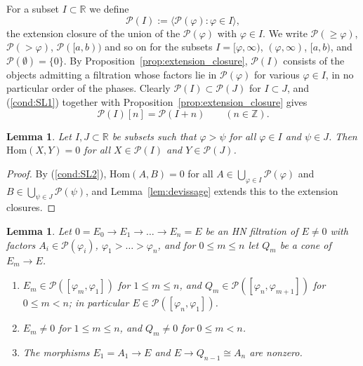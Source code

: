 \documentclass[12pt]{amsart}
\newcommand{\condref}[1]{\textup{(\ref{#1})}}
\newtheorem{lemma}[theorem]{Lemma}
\numberwithin{theorem}{section}
\theoremstyle{definition}
\newcommand{\RR}{\mathbb{R}}
\newcommand{\ZZ}{\mathbb{Z}}
\newcommand{\calP}{\mathcal{P}}
\newcommand{\Hom}{\mathrm{Hom}}
\begin{document}
	For a subset $I \subset \RR$ we define
	\[
	\calP(I) := \big\langle \calP(\varphi) : \varphi \in I \big\rangle ,
	\]
	the extension closure of the union of the $\calP(\varphi)$ with $\varphi \in I$.
	We write $\calP(\geqslant \varphi)$, $\calP(> \varphi)$, $\calP([a, b))$ and so on for the subsets $I = [\varphi, \infty)$, $(\varphi, \infty)$, $[a, b)$, and $\calP(\emptyset) = \{ 0 \}$.
	By Proposition~\ref{prop:extension_closure}, $\calP(I)$ consists of the objects admitting a filtration whose factors lie in $\calP(\varphi)$ for various $\varphi \in I$, in no particular order of the phases.
	Clearly $\calP(I) \subset \calP(J)$ for $I \subset J$, and \condref{cond:SL1} together with Proposition~\ref{prop:extension_closure} gives
	\[
	\calP(I)[n] = \calP(I + n) \qquad (n \in \ZZ) .
	\]

	\begin{lemma}
		\label{lem:slicing_orthogonal}
		Let $I, J \subset \RR$ be subsets such that $\varphi > \psi$ for all $\varphi \in I$ and $\psi \in J$.
		Then $\Hom(X, Y) = 0$ for all $X \in \calP(I)$ and $Y \in \calP(J)$.
	\end{lemma}

	\begin{proof}
		By \condref{cond:SL2}, $\Hom(A, B) = 0$ for all $A \in \bigcup_{\varphi \in I} \calP(\varphi)$ and $B \in \bigcup_{\psi \in J} \calP(\psi)$, and Lemma~\ref{lem:devissage} extends this to the extension closures.
	\end{proof}

	\begin{lemma}
		\label{lem:HN_steps}
		Let $0 = E_0 \to E_1 \to \ldots \to E_n = E$ be an HN filtration of $E \neq 0$ with factors $A_i \in \calP(\varphi_i)$, $\varphi_1 > \ldots > \varphi_n$, and for $0 \leqslant m \leqslant n$ let $Q_m$ be a cone of $E_m \to E$.
		\begin{enumerate}
			\item $E_m \in \calP([\varphi_m, \varphi_1])$ for $1 \leqslant m \leqslant n$, and $Q_m \in \calP([\varphi_n, \varphi_{m+1}])$ for $0 \leqslant m < n$; in particular $E \in \calP([\varphi_n, \varphi_1])$.
			\item $E_m \neq 0$ for $1 \leqslant m \leqslant n$, and $Q_m \neq 0$ for $0 \leqslant m < n$.
			\item The morphisms $E_1 = A_1 \to E$ and $E \to Q_{n-1} \cong A_n$ are nonzero.
		\end{enumerate}
	\end{lemma}
\end{document}
